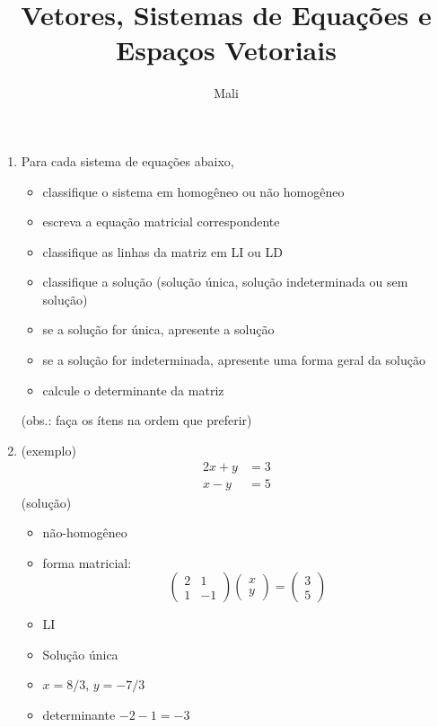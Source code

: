 \documentclass{article}
\title{Vetores, Sistemas de Equações e Espaços Vetoriais}
\author{Mali}
\begin{document}
\maketitle


\begin{enumerate}

		\item Para cada sistema de equações abaixo,
		\begin{itemize}
			\item classifique o sistema em homogêneo ou não homogêneo
			\item escreva a equação matricial correspondente
			\item classifique as linhas da matriz em LI ou LD
			\item classifique a solução (solução única, solução indeterminada ou sem solução)
			\item se a solução for única, apresente a solução
			\item se a solução for indeterminada, apresente uma forma geral da solução
			\item calcule o determinante da matriz
		\end{itemize}
		(obs.: faça os ítens na ordem que preferir)
			\item (exemplo) \begin{align*}
				2x + y &= 3\\
				x -y &= 5
			\end{align*}
(solução) 
		\begin{itemize}
		\item não-homogêneo
		\item forma matricial: \[ \left( \begin{array}{ccc}
			2 & 1 \\
			1 & -1 \end{array} \right)\left( \begin{array}{ccc} x\\y \end{array} \right) 
			= \left( \begin{array}{ccc} 3\\5 \end{array} \right)\] 
		\item LI
		\item Solução única
		\item $x = 8/3$, $y=-7/3$
		\item determinante $-2-1=-3$
		\end{itemize}
		\begin{enumerate}

\end{enumerate}
\end{enumerate}
\end{document}
